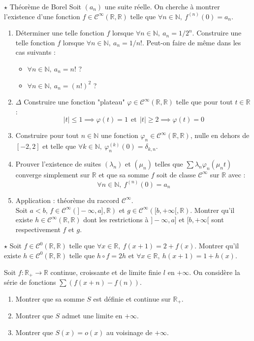 \documentclass[french,a4paper]{article}
\newcommand{\N}{\mathbb{N}}
\newcommand{\R}{\mathbb{R}}
\theoremstyle{plain}
\theoremstyle{definition}
\theoremstyle{remark}
\begin{document}
\begin{ex}{$\star$ Théorème de Borel}
	Soit $(a_n)$ une suite réelle. On cherche à montrer l'existence d'une fonction $f\in\mathcal{C}^\infty(\R,\R)$ telle que $\forall n\in\N,\ f^{(n)}(0)=a_n$.
	\begin{enumerate}
		\item Déterminer une telle fonction $f$ lorsque $\forall n\in\N,\ a_n=1/2^n$. Construire une telle fonction $f$ lorsque $\forall n\in\N,\ a_n=1/n!$. Peut-on faire de même dans les cas suivants :
		\begin{itemize}
			\item $\forall n\in\N,\ a_n=n!$ ?
			\item $\forall n\in\N,\ a_n=(n!)^2$ ?
		\end{itemize}
		\item $\Delta$ Construire une fonction "plateau" $\varphi\in\mathcal{C}^\infty(\R,\R)$ telle que pour tout $t\in\R$ : $$\lvert t\rvert\leqslant 1\implies\varphi(t)=1\ \ \text{et}\ \ \lvert t\rvert\geqslant 2\implies \varphi(t)=0$$
		\item Construire pour tout $n\in\N$ une fonction $\varphi_n\in\mathcal{C}^\infty(\R,\R)$, nulle en dehors de $[-2,2]$ et telle que $\forall k\in\N,\ \varphi_n^{(k)}(0)=\delta_{k,n}$.
		\item Prouver l'existence de suites $(\lambda_n)$ et $(\mu_n)$ telles que $\sum \lambda_n\varphi_n(\mu_n t)$ converge simplement sur $\R$ et que sa somme $f$ soit de classe $\mathcal{C}^\infty$ sur $\R$ avec : $$\forall n\in\N,\ f^{(n)}(0)=a_n$$
		\item Application : théorème du raccord $\mathcal{C}^\infty$. \\ Soit $a<b$, $f\in\mathcal{C}^\infty(]-\infty,a],\R)$ et $g\in\mathcal{C}^\infty([b,+\infty[,\R)$. Montrer qu'il existe $h\in\mathcal{C}^\infty(\R,\R)$ dont les restrictions à $]-\infty,a]$ et $[b,+\infty[$ sont respectivement $f$ et $g$.
	\end{enumerate}
\end{ex}

\begin{ex}{$\star$}
	Soit $f\in\mathcal{C}^0(\R,\R)$ telle que $\forall x\in\R,\ f(x+1)=2+f(x)$. Montrer qu'il existe $h\in\mathcal{C}^0(\R,\R)$ telle que $h\circ f=2h$ et $\forall x\in\R,\  h(x+1)=1+h(x)$.
\end{ex}

\begin{ex}{}
	Soit $f:\R_+\to\R$ continue, croissante et de limite finie $l$ en $+\infty$. On considère la série de fonctions $\sum(f(x+n)-f(n))$.
	\begin{enumerate}
		\item Montrer que sa somme $S$ est définie et continue sur $\R_+$.
		\item Montrer que $S$ admet une limite en $+\infty$.
		\item Montrer que $S(x)=o(x)$ au voisinage de $+\infty$.
	\end{enumerate}
\end{ex}
\end{document}

